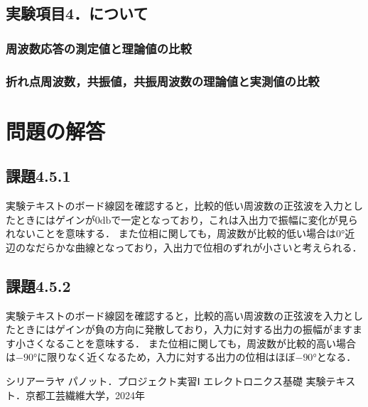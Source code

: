 \documentclass{jlreq}
\numberwithin{equation}{section}
\begin{document}
\subsection{実験項目4．について}
\subsubsection{周波数応答の測定値と理論値の比較}

\subsubsection{折れ点周波数，共振値，共振周波数の理論値と実測値の比較}

\section{問題の解答}
\subsection*{課題4.5.1}
実験テキストのボード線図を確認すると，比較的低い周波数の正弦波を入力としたときにはゲインが$0 \si{\decibel}$で一定となっており，これは入出力で振幅に変化が見られないことを意味する．
また位相に関しても，周波数が比較的低い場合は$0 \si{\degree}$近辺のなだらかな曲線となっており，入出力で位相のずれが小さいと考えられる．

\subsection*{課題4.5.2}
実験テキストのボード線図を確認すると，比較的高い周波数の正弦波を入力としたときにはゲインが負の方向に発散しており，入力に対する出力の振幅がますます小さくなることを意味する．
また位相に関しても，周波数が比較的高い場合は$-90 \si{\degree}$に限りなく近くなるため，入力に対する出力の位相はほぼ$-90 \si{\degree}$となる．

\begin{thebibliography}{9}
  \item シリアーラヤ パノット．プロジェクト実習Ⅰ エレクトロニクス基礎 実験テキスト．京都工芸繊維大学，2024年
\end{thebibliography}
\end{document}
